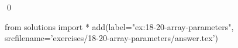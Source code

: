 
\begin{ex}
  \label{ex:18-20-array-parameters}
  
  \qed
\end{ex}
\begin{python0}
from solutions import *
add(label="ex:18-20-array-parameters",
    srcfilename='exercises/18-20-array-parameters/answer.tex')
\end{python0}
